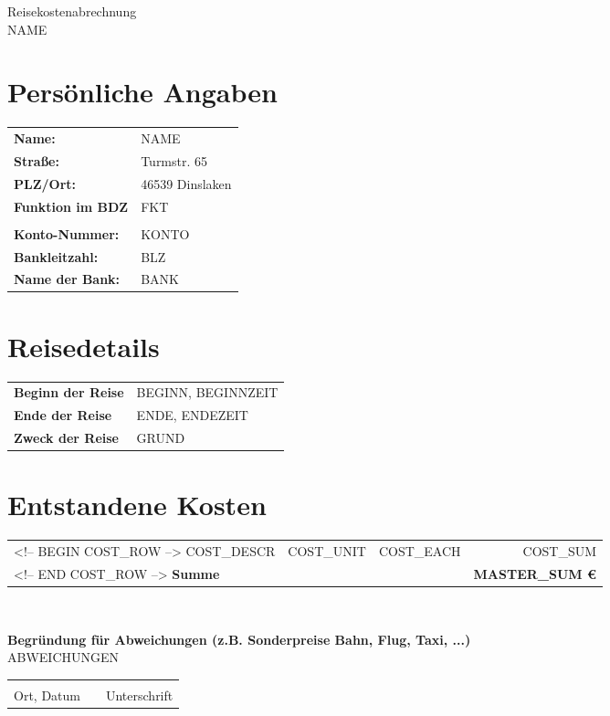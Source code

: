 \documentclass[a4paper,12pt]{article}
\begin{document}
\setlength{\parindent}{0mm}
\begin{center}
{\huge Reisekostenabrechnung}\\
{\large {NAME}} \\
\end{center}

%
\section{Persönliche Angaben}
\begin{tabular}[t]{ll}
\textbf{Name:} & {NAME} \\
\textbf{Straße:} & Turmstr. 65 \\
\textbf{PLZ/Ort:} & 46539 Dinslaken \\
\textbf{Funktion im BDZ} &  {FKT} \\
\\
\textbf{Konto-Nummer:} & {KONTO} \\
\textbf{Bankleitzahl:} & {BLZ} \\
\textbf{Name der Bank:} & {BANK} \\
\end{tabular}
\section{Reisedetails}
\begin{tabular}[t]{ll}
\textbf{Beginn der Reise} & {BEGINN}, {BEGINNZEIT} \\
\textbf{Ende der Reise} & {ENDE}, {ENDEZEIT} \\
\textbf{Zweck der Reise} & {GRUND} \\
\end{tabular}
\section{Entstandene Kosten}
\begin{tabular}[t]{lrlr}
<!-- BEGIN COST_ROW -->
{COST_DESCR} & {COST_UNIT} & {COST_EACH} & {COST_SUM} \\
<!-- END COST_ROW -->
\hline
\textbf{Summe} & & & \textbf{{MASTER_SUM} €} \\
\hline
\hline
\end{tabular} \\
\vspace{1cm}

\textbf{Begründung für Abweichungen (z.B. Sonderpreise Bahn, Flug, Taxi, ...)} \\
{ABWEICHUNGEN}

\vfill
\begin{tabular}{lp{4em}l}
\hspace{7cm}   && \hspace{7cm} \\
\cline{1-1}\cline{3-3}
 Ort, Datum     && Unterschrift
\end{tabular} 
\end{document}
